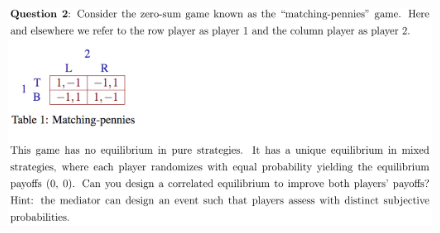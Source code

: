 \documentclass[12pt]{article}
\begin{document}
\pagebreak
\begin{figure}[h!]
\includegraphics[width=\linewidth]{./assets/201806021725.png}
\end{figure}
\end{document}
